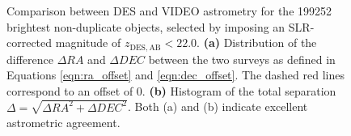 \begin{figure}
\centering
{}
\caption[Verification of the astrometry]{Comparison between DES and VIDEO astrometry for the \num{199 252} brightest non-duplicate objects, selected by imposing an SLR-corrected magnitude of $z_{\mathrm{DES,AB}}<22.0$. \textbf{(a)} Distribution of the difference  $\Delta RA$ and $\Delta DEC$ between the two surveys as defined in Equations \ref{eqn:ra_offset} and \ref{eqn:dec_offset}. The dashed red lines correspond to an offset of 0. \textbf{(b)} Histogram of the total separation $\Delta=\sqrt{{\Delta RA}^2 + {\Delta DEC}^2}$. Both (a) and (b) indicate excellent astrometric agreement.}
\label{fig:astrometry}
\end{figure}





